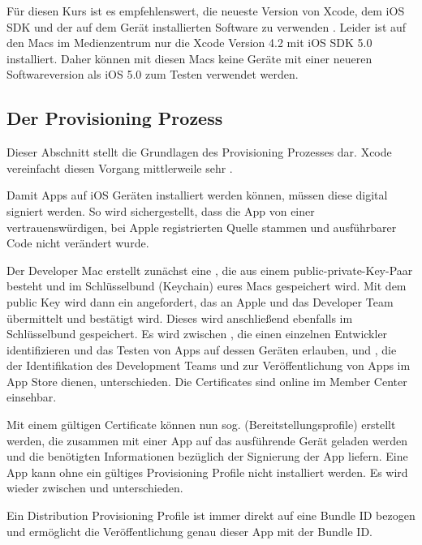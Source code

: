 \documentclass[parskip=half, final]{scrreprt}
\begin{document}
Für diesen Kurs ist es empfehlenswert, die neueste Version von Xcode, dem iOS SDK und der auf dem Gerät installierten Software zu verwenden . Leider ist auf den Macs im Medienzentrum nur die Xcode Version 4.2 mit iOS SDK 5.0 installiert. Daher können mit diesen Macs keine Geräte mit einer neueren Softwareversion als iOS 5.0 zum Testen verwendet werden.

\subsection{Der Provisioning Prozess}\label{sec:provisioning}

 Dieser Abschnitt stellt die Grundlagen des Provisioning Prozesses dar. Xcode vereinfacht diesen Vorgang mittlerweile sehr .

Damit Apps auf iOS Geräten installiert werden können, müssen diese digital signiert werden. So wird sichergestellt, dass die App von einer vertrauenswürdigen, bei Apple registrierten Quelle stammen und ausführbarer Code nicht verändert wurde.

Der Developer Mac erstellt zunächst eine , die aus einem public-private-Key-Paar besteht und im Schlüsselbund (Keychain) eures Macs gespeichert wird. Mit dem public Key wird dann ein  angefordert, das an Apple und das Developer Team übermittelt und bestätigt wird. Dieses wird anschließend ebenfalls im Schlüsselbund gespeichert. Es wird zwischen , die einen einzelnen Entwickler identifizieren und das Testen von Apps auf dessen Geräten erlauben, und , die der Identifikation des Development Teams und zur Veröffentlichung von Apps im App Store dienen, unterschieden. Die Certificates sind online im Member Center  einsehbar.

Mit einem gültigen Certificate können nun sog.  (Bereitstellungsprofile) erstellt werden, die zusammen mit einer App auf das ausführende Gerät geladen werden und die benötigten Informationen bezüglich der Signierung der App liefern. Eine App kann ohne ein gültiges Provisioning Profile nicht installiert werden. Es wird wieder zwischen  und  unterschieden.

Ein Distribution Provisioning Profile ist immer direkt auf eine Bundle ID bezogen und ermöglicht die Veröffentlichung genau dieser App mit der Bundle ID.
\end{document}
